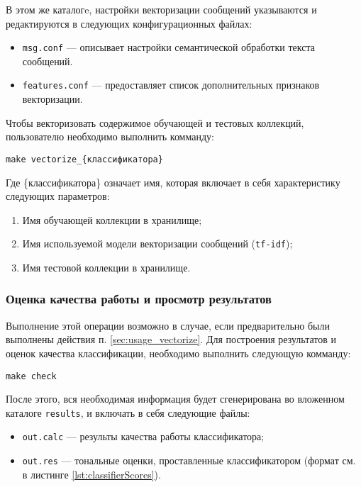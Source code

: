         В этом же каталогe, настройки векторизации сообщений указываются и редактируются в следующих
        конфигурационных файлах:
        \begin{itemize}
            \item {\tt msg.conf} --- описывает настройки семантической обработки текста
            сообщений. %
            \item {\tt features.conf} --- предоставляет список дополнительных признаков векторизации. %
        \end{itemize}

        Чтобы векторизовать содержимое обучающей и тестовых коллекций, пользователю
        необходимо выполнить комманду:
        \begin{center}
            {\tt make vectorize\_{\{ классификатора}\}}
        \end{center}

        Где {\{ классификатора}\} означает имя, которая включает в
        себя характеристику следующих параметров:
        \begin{enumerate}
            \item Имя обучающей коллекции в хранилище;
            \item Имя используемой модели векторизации сообщений ({\tt tf-idf});
            \item Имя тестовой коллекции в хранилище.
        \end{enumerate}

        \subsubsection{Оценка качества работы и просмотр результатов}
        Выполнение этой операции возможно в случае, если предварительно были
        выполнены действия п. \ref{sec:usage_vectorize}.
        Для построения результатов и оценок качества классификации, необходимо
        выполнить следующую комманду:
        \begin{center}
            {\tt make check}
        \end{center}

        После этого, вся необходимая информация будет сгенерирована во вложенном
        каталоге {\tt results}, и включать в себя следующие файлы:
        \begin{itemize}
            \item {\tt out.calc} --- результы качества работы классификатора;
            \item {\tt out.res} --- тональные оценки, проставленные
            классификатором (формат см. в листинге \ref{lst:classifierScores}).
        \end{itemize}

